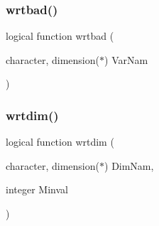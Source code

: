 \mbox{\label{_err_pack_8f_a39b9b11ebe066217c5eb36dda9009bab}} 
\subsubsection{\texorpdfstring{wrtbad()}{wrtbad()}}
{\footnotesize\ttfamily logical function wrtbad (\begin{DoxyParamCaption}\item[{character, dimension($\ast$)}]{Var\+Nam }\end{DoxyParamCaption})}

\mbox{\label{_err_pack_8f_ac00ea4bd5d2336abbbfaa44c3822eaad}} 
\subsubsection{\texorpdfstring{wrtdim()}{wrtdim()}}
{\footnotesize\ttfamily logical function wrtdim (\begin{DoxyParamCaption}\item[{character, dimension($\ast$)}]{Dim\+Nam,  }\item[{integer}]{Minval }\end{DoxyParamCaption})}

